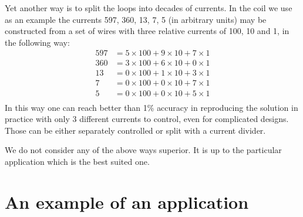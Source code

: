 Yet another way is to split the loops into decades of currents. In the coil we use as an example the currents 597, 360, 13, 7, 5 (in arbitrary units) may be constructed from a set of wires with three relative currents of 100, 10 and 1, in the following way:
\begin{align*}
  597 & = 5 \times 100 + 9 \times 10 + 7 \times 1 \\
  360 & = 3 \times 100 + 6 \times 10 + 0 \times 1 \\
  13 & = 0 \times 100 + 1 \times 10 + 3 \times 1 \\
  7 & = 0 \times 100 + 0 \times 10 + 7 \times 1 \\
  5 & = 0 \times 100 + 0 \times 10 + 5 \times 1 \\
\end{align*}
In this way one can reach better than 1\% accuracy in reproducing the solution in practice with only 3 different currents to control, even for complicated designs. Those can be either separately controlled or split with a current divider.

We do not consider any of the above ways superior. It is up to the particular application which is the best suited one.






\section{An example of an application}

